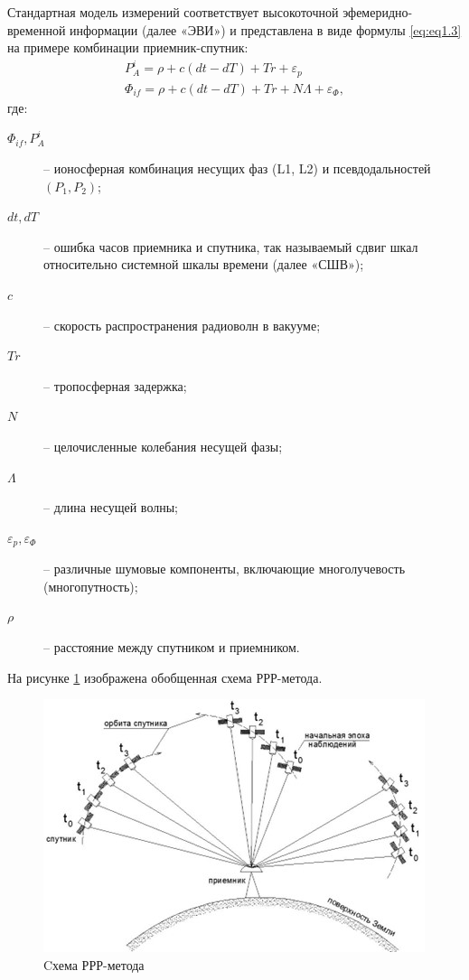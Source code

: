 Стандартная модель измерений соответствует высокоточной эфемеридно-временной информации (далее «ЭВИ») и представлена в виде формулы \cref{eq:eq1.3} на примере комбинации приемник-спутник:
\begin{equation}
	\label{eq:eq1.3}
	\begin{array}{l}
		P_{A}^{i}=\rho+c\left(dt-dT\right)+Tr+\varepsilon_{p}\\
		\varPhi_{if}=\rho+c\left(dt-dT\right)+Tr+N\varLambda+\varepsilon_{\Phi},
	\end{array}
\end{equation}
где: 
\begin{description}
	\item[$\varPhi_{if}, P_{A}^{i}$] -- ионосферная комбинация несущих фаз (L1, L2) и псевдодальностей $(P_1, P_2)$; 
	\item[$dt, dT$] -- ошибка часов приемника и спутника, так называемый сдвиг шкал относительно системной шкалы времени (далее «СШВ»);
	\item[$c$] -- скорость распространения радиоволн в вакууме;
	\item[$Tr$] -- тропосферная задержка;
	\item[$N$] -- целочисленные колебания несущей фазы;  
	\item[$\varLambda$] -- длина несущей волны;
	\item[$\varepsilon_{p}, \varepsilon_{\Phi}$] -- различные шумовые компоненты, включающие многолучевость (многопутность); 
	\item[$\rho$] -- расстояние между спутником и приемником.
\end{description}

На рисунке \cref{fig:pic03} изображена обобщенная схема РРР-метода.
\begin{figure}[h]
	\centering
	\includegraphics[width=0.7\linewidth]{images/pic03}
	\caption{Cхема РРР-метода}
	\label{fig:pic03}
\end{figure}


